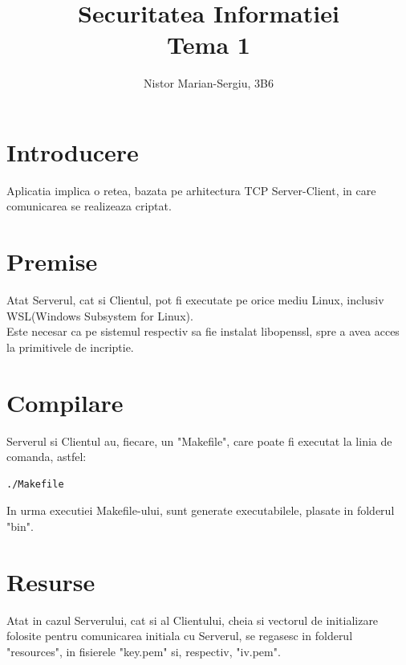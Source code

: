 \documentclass{article}
\author{Nistor Marian-Sergiu, 3B6}
\title{%
  	\textbf{Securitatea Informatiei} \\
  	\textbf{\large{Tema 1}} \\
}
\begin{document}
\maketitle



\section{Introducere}
Aplicatia implica o retea, bazata pe arhitectura TCP Server-Client, in care comunicarea se realizeaza criptat.


\section{Premise}
Atat Serverul, cat si Clientul, pot fi executate pe orice mediu Linux, inclusiv WSL(Windows Subsystem for Linux). \\
Este necesar ca pe sistemul respectiv sa fie instalat libopenssl, spre a avea acces la primitivele de incriptie.


\section{Compilare}
Serverul si Clientul au, fiecare, un "Makefile", care poate fi executat la linia de comanda, astfel:
\begin{verbatim}
./Makefile
\end{verbatim}
In urma executiei Makefile-ului, sunt generate executabilele, plasate in folderul "bin".


\section{Resurse}
Atat in cazul Serverului, cat si al Clientului, cheia si vectorul de initializare folosite pentru comunicarea initiala cu Serverul, se regasesc in folderul "resources", in fisierele "key.pem" si, respectiv, "iv.pem".
\end{document}
